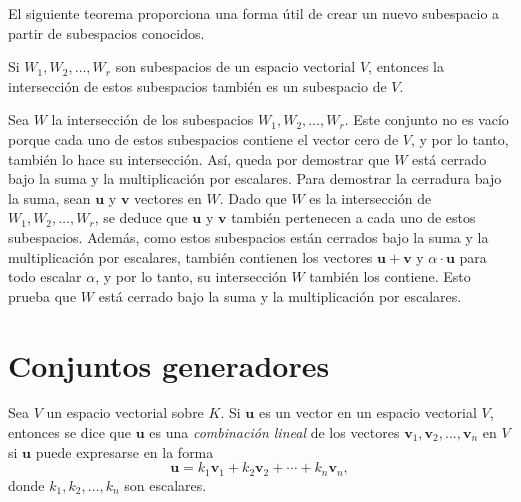 El siguiente teorema proporciona una forma útil de crear un nuevo subespacio a partir de subespacios conocidos.

\begin{theorem}{}{}
    Si $W_1, W_2, \dots, W_r$ son subespacios de un espacio vectorial $V$, entonces la intersección de estos subespacios también es un subespacio de $V$.

    \tcblower
    \demostracion Sea $W$ la intersección de los subespacios $W_1, W_2, \dots, W_r$. Este conjunto no es vacío porque cada uno de estos subespacios contiene el vector cero de $V$, y por lo tanto, también lo hace su intersección. Así, queda por demostrar que $W$ está cerrado bajo la suma y la multiplicación por escalares. Para demostrar la cerradura bajo la suma, sean $\mathbf{u}$ y $\mathbf{v}$ vectores en $W$. Dado que $W$ es la intersección de $W_1, W_2, \dots, W_r$, se deduce que $\mathbf{u}$ y $\mathbf{v}$ también pertenecen a cada uno de estos subespacios. Además, como estos subespacios están cerrados bajo la suma y la multiplicación por escalares, también contienen los vectores $\mathbf{u} + \mathbf{v}$ y $\alpha \cdot \mathbf{u}$ para todo escalar $\alpha$, y por lo tanto, su intersección $W$ también los contiene. Esto prueba que $W$ está cerrado bajo la suma y la multiplicación por escalares.
\end{theorem}

\section{Conjuntos generadores}

\begin{definicion}{}{}
    Sea $V$ un espacio vectorial sobre $K$. Si $\mathbf{u}$ es un vector en un espacio vectorial $V$, entonces se dice que $\mathbf{u}$ es una \emph{combinación lineal} de los vectores $\mathbf{v}_1, \mathbf{v}_2, \dots, \mathbf{v}_n$ en $V$ si $\mathbf{u}$ puede expresarse en la forma
    $$\mathbf{u} = k_1 \mathbf{v}_1 + k_2 \mathbf{v}_2 + \cdots + k_n \mathbf{v}_n,$$
    donde $k_1, k_2, \dots, k_n$ son escalares.
\end{definicion}

